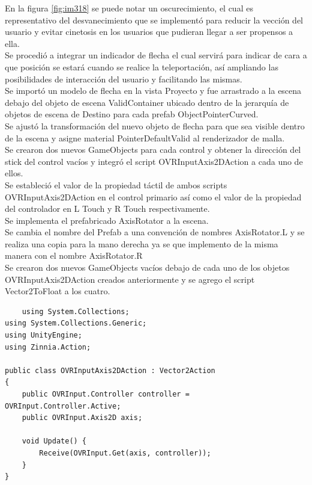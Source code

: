 En la figura \ref{fig:im318} se puede notar un oscurecimiento, el cual es representativo del desvanecimiento que se implementó para reducir la vección del usuario y evitar 
cinetosis en los usuarios que pudieran llegar a ser propensos a ella.\\
Se procedió a integrar un indicador de flecha el cual servirá para indicar de cara a que posición se estará cuando se realice la teleportación, así ampliando las posibilidades 
de interacción del usuario y facilitando las mismas.\\
Se importó un modelo de flecha en la vista Proyecto y fue arrastrado a la escena debajo del objeto de escena ValidContainer ubicado dentro de la jerarquía de objetos de escena 
de Destino para cada prefab ObjectPointerCurved.\\
Se ajustó la transformación del nuevo objeto de flecha para que sea visible dentro de la escena y asigne material PointerDefaultValid al renderizador de malla.\\
Se crearon dos nuevos GameObjects para cada control y obtener la dirección del stick del control vacíos y integró el script OVRInputAxis2DAction a cada uno de ellos.\\
Se estableció el valor de la propiedad táctil de ambos scripts OVRInputAxis2DAction en el control primario así como el valor de la propiedad del controlador en L Touch 
y R Touch respectivamente.\\
Se implementa el prefabricado AxisRotator a la escena.\\
Se cambia el nombre del Prefab a una convención de nombres AxisRotator.L  y se realiza una copia para la mano derecha ya se que implemento de la misma manera con el nombre AxisRotator.R\\
Se crearon dos nuevos GameObjects vacíos debajo de cada uno de los objetos OVRInputAxis2DAction creados anteriormente y se agrego el script Vector2ToFloat a los cuatro.\\

\begin{verbatim}
    using System.Collections;
using System.Collections.Generic;
using UnityEngine;
using Zinnia.Action;
 
public class OVRInputAxis2DAction : Vector2Action
{
    public OVRInput.Controller controller = OVRInput.Controller.Active;
    public OVRInput.Axis2D axis;
 
    void Update() {
        Receive(OVRInput.Get(axis, controller));
    }
}
\end{verbatim}

